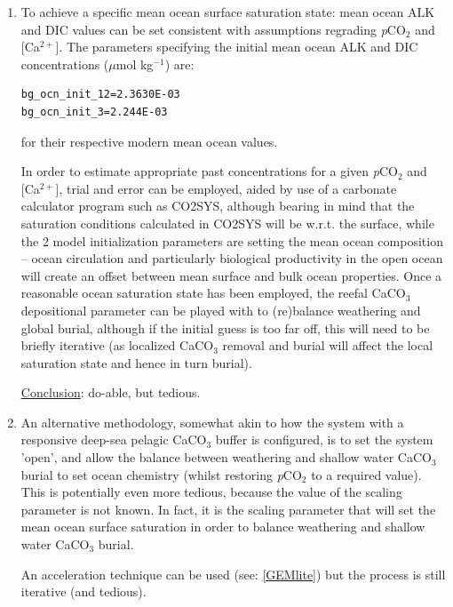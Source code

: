 \documentclass[11pt,fleqn]{book} %
\begin{document}
\begin{enumerate}

\vspace{1mm}
\item To achieve a specific mean ocean surface saturation state: mean ocean ALK and DIC values can be set consistent with assumptions regrading \textit{p}CO\(_{2}\) and [Ca\(^{2+}\)]. The parameters specifying the initial mean ocean ALK and DIC concentrations (\(\mu\)mol kg\(^{-1}\)) are:
\vspace{-1mm}\begin{verbatim}
bg_ocn_init_12=2.3630E-03
bg_ocn_init_3=2.244E-03
\end{verbatim}\vspace{-1mm}
for their respective modern mean ocean values.

In order to estimate appropriate past concentrations for a given \textit{p}CO\(_{2}\)  and [Ca\(^{2+}\)], trial and error can be employed, aided by use of a carbonate calculator program such as CO2SYS, although bearing in mind that the saturation conditions calculated in CO2SYS will be w.r.t. the surface, while the 2 model initialization parameters are setting the mean ocean composition -- ocean circulation and particularly biological productivity in the open ocean will create an offset between mean surface and bulk ocean properties.
Once a reasonable ocean saturation state has been employed, the reefal CaCO$_{3}$ depositional parameter can be played with to (re)balance weathering and global burial, although if the initial guess is too far off, this will need to be briefly iterative (as localized CaCO$_{3}$ removal and burial will affect the local saturation state and hence in turn burial).

\uline{Conclusion}: do-able, but tedious.
        
\vspace{1mm}
\item An alternative methodology, somewhat akin to how the system with a responsive deep-sea pelagic CaCO$_{3}$ buffer is configured, is to set the system 'open', and allow the balance between weathering and shallow water CaCO$_{3}$ burial to set ocean chemistry (whilst restoring \textit{p}CO\(_{2}\) to a required value). This is potentially even more tedious, because the value of the scaling parameter is not known. In fact, it is the scaling parameter that will set the mean ocean surface saturation in order to balance weathering and shallow water CaCO$_{3}$ burial.

An acceleration technique can be used (see: \ref{GEMlite}) but the process is still iterative (and tedious).


\end{enumerate}
\end{document}
